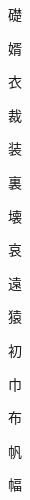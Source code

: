 \begin{spacing}{2.5}
{\Huge \begin{CJK}{UTF8}{min} 礎\end{CJK}}\hspace{0.1cm}
{\Huge \begin{CJK}{UTF8}{min} 婿\end{CJK}}\hspace{0.1cm}
{\Huge \begin{CJK}{UTF8}{min} 衣\end{CJK}}\hspace{0.1cm}
{\Huge \begin{CJK}{UTF8}{min} 裁\end{CJK}}\hspace{0.1cm}
{\Huge \begin{CJK}{UTF8}{min} 装\end{CJK}}\hspace{0.1cm}
{\Huge \begin{CJK}{UTF8}{min} 裏\end{CJK}}\hspace{0.1cm}
{\Huge \begin{CJK}{UTF8}{min} 壊\end{CJK}}\hspace{0.1cm}
{\Huge \begin{CJK}{UTF8}{min} 哀\end{CJK}}\hspace{0.1cm}
{\Huge \begin{CJK}{UTF8}{min} 遠\end{CJK}}\hspace{0.1cm}
{\Huge \begin{CJK}{UTF8}{min} 猿\end{CJK}}\hspace{0.1cm}
{\Huge \begin{CJK}{UTF8}{min} 初\end{CJK}}\hspace{0.1cm}
{\Huge \begin{CJK}{UTF8}{min} 巾\end{CJK}}\hspace{0.1cm}
{\Huge \begin{CJK}{UTF8}{min} 布\end{CJK}}\hspace{0.1cm}
{\Huge \begin{CJK}{UTF8}{min} 帆\end{CJK}}\hspace{0.1cm}
{\Huge \begin{CJK}{UTF8}{min} 幅\end{CJK}}\hspace{0.1cm}

\end{spacing}
